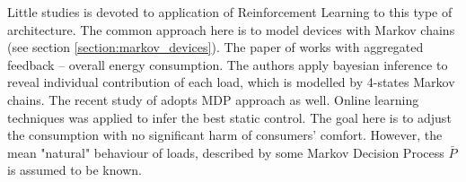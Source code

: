 Little studies is devoted to application of Reinforcement Learning to this type of architecture. The common approach here is to model devices with Markov chains (see section \ref{section:markov_devices}). The paper of \cite{Taylor2014} works with aggregated feedback -- overall energy consumption. The authors apply bayesian inference to reveal individual contribution of each load, which is modelled by 4-states Markov chains. The recent study of \cite{Chertkov2017} adopts MDP approach as well. Online learning techniques was applied to infer the best static control. The goal here is to adjust the consumption with no significant harm of consumers' comfort.  However, the mean "natural" behaviour of loads, described by some Markov Decision Process $\bar{P}$ is assumed to be known.